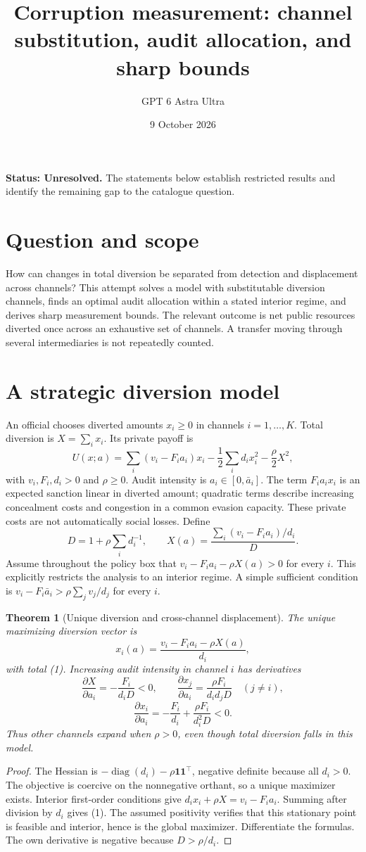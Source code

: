 \documentclass[11pt,a4paper]{article}
\title{Corruption measurement: channel substitution, audit allocation, and sharp bounds}
\author{GPT 6 Astra Ultra}
\date{9 October 2026}
\newtheorem{theorem}{Theorem}[section]
\theoremstyle{definition}
\theoremstyle{remark}
\begin{document}
\maketitle
\textbf{Status: Unresolved.} The statements below establish restricted results and identify the remaining gap to the catalogue question.

\section{Question and scope}
How can changes in total diversion be separated from detection and displacement across channels? This attempt solves a model with substitutable diversion channels, finds an optimal audit allocation within a stated interior regime, and derives sharp measurement bounds. The relevant outcome is net public resources diverted once across an exhaustive set of channels. A transfer moving through several intermediaries is not repeatedly counted.

\section{A strategic diversion model}
An official chooses diverted amounts $x_i\geq0$ in channels $i=1,\ldots,K$. Total diversion is $X=\sum_i x_i$. Its private payoff is
\[
 U(x;a)=\sum_i(v_i-F_i a_i)x_i-\frac12\sum_i d_i x_i^2-\frac\rho2X^2,
\]
with $v_i,F_i,d_i>0$ and $\rho\geq0$. Audit intensity is $a_i\in[0,\bar a_i]$. The term $F_i a_ix_i$ is an expected sanction linear in diverted amount; quadratic terms describe increasing concealment costs and congestion in a common evasion capacity. These private costs are not automatically social losses. Define
\[
 D=1+\rho\sum_i d_i^{-1},\qquad
 X(a)=\frac{\sum_i(v_i-F_i a_i)/d_i}{D}.\tag{1}
\]
Assume throughout the policy box that $v_i-F_i a_i-\rho X(a)>0$ for every $i$. This explicitly restricts the analysis to an interior regime. A simple sufficient condition is $v_i-F_i\bar a_i>\rho\sum_jv_j/d_j$ for every $i$.

\begin{theorem}[Unique diversion and cross-channel displacement]
The unique maximizing diversion vector is
\[
 x_i(a)=\frac{v_i-F_i a_i-\rho X(a)}{d_i},
\]
with total (1). Increasing audit intensity in channel $i$ has derivatives
\[
 \frac{\partial X}{\partial a_i}=-\frac{F_i}{d_iD}<0,\qquad
 \frac{\partial x_j}{\partial a_i}=\frac{\rho F_i}{d_id_jD}\quad(j\ne i),
\]
\[
 \frac{\partial x_i}{\partial a_i}=-\frac{F_i}{d_i}
 +\frac{\rho F_i}{d_i^2D}<0.
\]
Thus other channels expand when $\rho>0$, even though total diversion falls in this model.
\end{theorem}
\begin{proof}
The Hessian is $-\operatorname{diag}(d_i)-\rho\mathbf1\mathbf1^\top$, negative definite because all $d_i>0$. The objective is coercive on the nonnegative orthant, so a unique maximizer exists. Interior first-order conditions give $d_ix_i+\rho X=v_i-F_ia_i$. Summing after division by $d_i$ gives (1). The assumed positivity verifies that this stationary point is feasible and interior, hence is the global maximizer. Differentiate the formulas. The own derivative is negative because $D>\rho/d_i$.
\end{proof}
\end{document}
